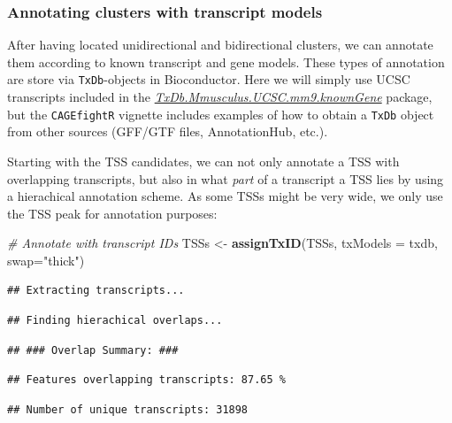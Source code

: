 \documentclass[9pt,a4paper,]{extarticle}
\newenvironment{Shaded}{\begin{snugshade}}{\end{snugshade}}
\newcommand{\KeywordTok}[1]{\textcolor[rgb]{0.13,0.29,0.53}{\textbf{{#1}}}}
\newcommand{\DataTypeTok}[1]{\textcolor[rgb]{0.13,0.29,0.53}{{#1}}}
\newcommand{\StringTok}[1]{\textcolor[rgb]{0.31,0.60,0.02}{{#1}}}
\newcommand{\CommentTok}[1]{\textcolor[rgb]{0.56,0.35,0.01}{\textit{{#1}}}}
\newcommand{\NormalTok}[1]{{#1}}
\begin{document}
\subsubsection{Annotating clusters with transcript models}\label{annotating-clusters-with-transcript-models}

After having located unidirectional and bidirectional clusters, we can annotate them according to known transcript and gene models. These types of annotation are store via \texttt{TxDb}-objects in Bioconductor. Here we will simply use UCSC transcripts included in the \emph{\href{https://bioconductor.org/packages/3.8/TxDb.Mmusculus.UCSC.mm9.knownGene}{TxDb.Mmusculus.UCSC.mm9.knownGene}} package, but the \texttt{CAGEfightR} vignette includes examples of how to obtain a \texttt{TxDb} object from other sources (GFF/GTF files, AnnotationHub, etc.).

Starting with the TSS candidates, we can not only annotate a TSS with overlapping transcripts, but also in what \emph{part} of a transcript a TSS lies by using a hierachical annotation scheme. As some TSSs might be very wide, we only use the TSS peak for annotation purposes:

\begin{Shaded}
\begin{Highlighting}[]
\CommentTok{# Annotate with transcript IDs}
\NormalTok{TSSs <-}\StringTok{ }\KeywordTok{assignTxID}\NormalTok{(TSSs, }\DataTypeTok{txModels =} \NormalTok{txdb, }\DataTypeTok{swap=}\StringTok{"thick"}\NormalTok{)}
\end{Highlighting}
\end{Shaded}

\begin{verbatim}
## Extracting transcripts...
\end{verbatim}

\begin{verbatim}
## Finding hierachical overlaps...
\end{verbatim}

\begin{verbatim}
## ### Overlap Summary: ###
\end{verbatim}

\begin{verbatim}
## Features overlapping transcripts: 87.65 %
\end{verbatim}

\begin{verbatim}
## Number of unique transcripts: 31898
\end{verbatim}
\end{document}
